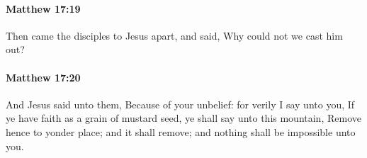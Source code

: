 		\paragraph{Matthew 17:19} %
			\label{MATTHEW-17-19}

			Then came the disciples to Jesus apart, and said, Why could not we cast him out?

			\begin{framed}
			\scriptsize
				\begin{compactdesc}
					\item[SBLG] 
				\end{compactdesc}
			\end{framed}

		\paragraph{Matthew 17:20} %
			\label{MATTHEW-17-20}

			And Jesus said unto them, Because of your unbelief: for verily I say unto you, If ye have faith as a grain of mustard seed, ye shall say unto this mountain, Remove hence to yonder place; and it shall remove; and nothing shall be impossible unto you.

